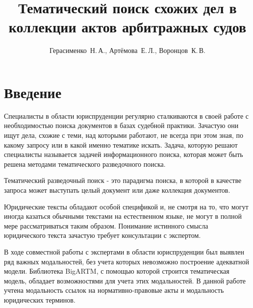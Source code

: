 \documentclass[12pt,twoside]{article}
\title
    [Тематический поиск схожих дел в коллекции актов арбитражных судов] %
    {Тематический поиск схожих дел в коллекции актов арбитражных судов}
\author
    [Герасименко~Н.\,А.] %
    {Герасименко~Н.\,А., Артёмова~Е.\,Л., Воронцов~К.\,В.} %
    [Герасименко~Н.\,А.$^1$, Артёмова~Е.\,Л.$^2$, Воронцов~К.\,В.$^3$] %
\begin{document}
\maketitle
\section{Введение}




Специалисты в области юриспруденции регулярно сталкиваются в своей работе с необходимостью поиска документов в базах судебной практики. Зачастую они ищут дела, схожие с теми, над которыми работают, не всегда при этом зная, по какому запросу или в какой именно тематике искать. Задача, которую решают специалисты называется задачей информационного поиска, которая может быть решена методами тематического разведочного поиска.

Тематический разведочный поиск - это парадигма поиска, в которой в качестве запроса может выступать целый документ или даже коллекция документов.


Юридические тексты обладают особой спецификой и, не смотря на то, что могут иногда казаться обычными текстами на естественном языке, не могут в полной мере рассматриваться таким образом. Понимание истинного смысла юридического текста зачастую требует консультации с экспертом.

В ходе совместной работы с экспертами в области юриспруденции был выявлен ряд важных модальностей, без учета которых невозможно построение адекватной модели. Библиотека BigARTM\cite{BigARTM2015}, с помощью которой строится тематическая модель, обладает возможностями для учета этих модальностей. В данной работе учтена модальность ссылок на нормативно-правовые акты и модальность юридических терминов.

\end{document}
